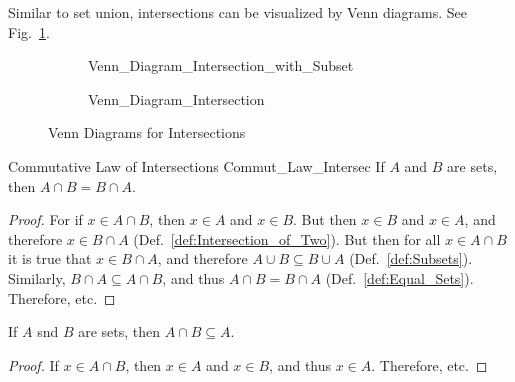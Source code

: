 \documentclass[crop=false,class=book,oneside]{standalone}
\begin{document}
            Similar to set union, intersections can be visualized
            by Venn diagrams. See
            Fig.~\ref{fig:Union_Intersection_venn_diagram}.
            \begin{figure}[H]
                \centering
                \captionsetup{type=figure}
                \begin{subfigure}[b]{0.49\textwidth}
                    \centering
                    
                        {Venn_Diagram_Intersection_with_Subset}
                \end{subfigure}
                \begin{subfigure}[b]{0.49\textwidth}
                    \centering
                    {Venn_Diagram_Intersection}
                \end{subfigure}
                \caption{Venn Diagrams for Intersections}
                \label{fig:Union_Intersection_venn_diagram}
            \end{figure}
            \begin{ltheorem}{Commutative Law of Intersections}
                  {Commut_Law_Intersec}
                If $A$ and $B$ are sets, then
                $A\cap{B}=B\cap{A}$.
            \end{ltheorem}
            \begin{proof}
                For if $x\in{A}\cap{B}$, then $x\in{A}$ and
                $x\in{B}$. But then $x\in{B}$ and $x\in{A}$,
                and therefore $x\in{B}\cap{A}$
                (Def.~\ref{def:Intersection_of_Two}). But then
                for all $x\in{A}\cap{B}$ it is true that
                $x\in{B}\cap{A}$, and therefore
                $A\cup{B}\subseteq{B}\cup{A}$
                (Def.~\ref{def:Subsets}). Similarly,
                $B\cap{A}\subseteq{A}\cap{B}$, and thus
                $A\cap{B}=B\cap{A}$ (Def.~\ref{def:Equal_Sets}).
                Therefore, etc.
            \end{proof}
            \begin{theorem}
                \label{thm:Intersection_is_Smaller}%
                If $A$ snd $B$ are sets, then
                $A\cap{B}\subseteq{A}$.
            \end{theorem}
            \begin{proof}
                If $x\in{A}\cap{B}$, then $x\in{A}$ and
                $x\in{B}$, and thus $x\in{A}$. Therefore, etc.
            \end{proof}
\end{document}
